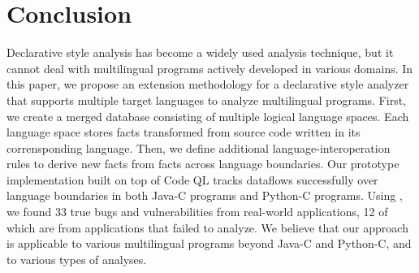 \section{Conclusion}\label{sec:conclude}
Declarative style analysis has become a widely used analysis technique, but it
cannot deal with multilingual programs actively developed in various domains.
In this paper, we propose an extension methodology for a declarative style
analyzer that supports multiple target languages to analyze multilingual
programs.
First, we create a merged database consisting of multiple logical language
spaces. 
Each language space stores facts transformed from source code written in its
corrensponding language.
Then, we define additional language-interoperation rules to derive new facts
from facts across language boundaries.
Our prototype implementation \ours built on top of Code QL tracks dataflows
successfully over language boundaries in both Java-C programs and Python-C
programs.
Using \ours, we found 33 true bugs and vulnerabilities from real-world
applications, 12 of which are from applications that \lees failed to analyze.
We believe that our approach is applicable to various multilingual programs
beyond Java-C and Python-C, and to various types of analyses.

